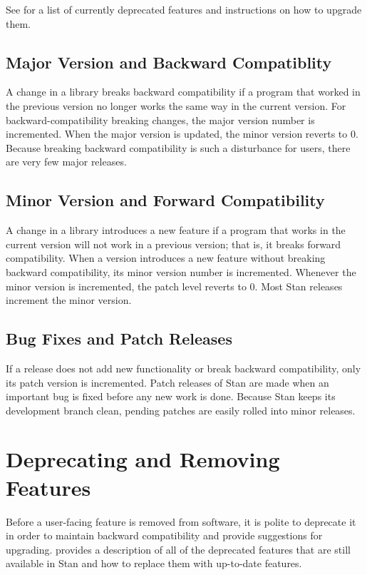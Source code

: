 See  for a list of currently
deprecated features and instructions on how to upgrade them.

\subsection{Major Version and Backward Compatiblity}

A change in a library breaks backward compatibility if a program that
worked in the previous version no longer works the same way in the
current version.  For backward-compatibility breaking changes, the
major version number is incremented.  When the major version is
updated, the minor version reverts to 0.  Because breaking backward
compatibility is such a disturbance for users, there are very few
major releases.

\subsection{Minor Version and Forward Compatibility}

A change in a library introduces a new feature if a program that works
in the current version will not work in a previous version; that is,
it breaks forward compatibility.  When a version introduces a new
feature without breaking backward compatibility, its minor version
number is incremented.  Whenever the minor version is incremented, the
patch level reverts to 0.  Most Stan releases increment the minor
version.

\subsection{Bug Fixes and Patch Releases}

If a release does not add new functionality or break backward
compatibility, only its patch version is incremented.  Patch releases
of Stan are made when an important bug is fixed before any new work is
done.  Because Stan keeps its development branch clean, pending
patches are easily rolled into minor releases.

\section{Deprecating and Removing Features}\label{process-deprecation.section}

Before a user-facing feature is removed from software, it is polite to
deprecate it in order to maintain backward compatibility and provide
suggestions for upgrading.   provides
a description of all of the deprecated features that are still
available in Stan and how to replace them with up-to-date features.

